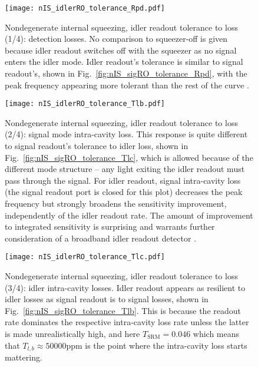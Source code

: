 \begin{figure}
    \centering
    \texttt{[image: nIS\_idlerRO\_tolerance\_Rpd.pdf]} 
    \caption{   Nondegenerate internal squeezing, idler readout tolerance to loss (1/4): detection losses. No comparison to squeezer-off is given because idler readout switches off with the squeezer as no signal enters the idler mode. Idler readout's tolerance is similar to signal readout's, shown in Fig.~\ref{fig:nIS_sigRO_tolerance_Rpd}, with the peak frequency appearing more tolerant than the rest of the curve . }
    \label{fig:}
\end{figure}
\begin{figure}
	\centering
	\texttt{[image: nIS\_idlerRO\_tolerance\_Tlb.pdf]}
	\caption{ Nondegenerate internal squeezing, idler readout tolerance to loss (2/4): signal mode intra-cavity loss. This response is quite different to signal readout's tolerance to idler loss, shown in Fig.~\ref{fig:nIS_sigRO_tolerance_Tlc}, which is allowed because of the different mode structure -- any light exiting the idler readout must pass through the signal. For idler readout, signal intra-cavity loss (the signal readout port is closed for this plot) decreases the peak frequency but strongly broadens the sensitivity improvement, independently of the idler readout rate. The amount of improvement to integrated sensitivity is surprising  and warrants further consideration of a broadband idler readout detector .}
	\label{fig:}
\end{figure}
\begin{figure}
	\centering
	\texttt{[image: nIS\_idlerRO\_tolerance\_Tlc.pdf]}
	\caption{  Nondegenerate internal squeezing, idler readout tolerance to loss (3/4): idler intra-cavity losses. Idler readout appears as resilient to idler losses as signal readout is to signal losses, shown in Fig.~\ref{fig:nIS_sigRO_tolerance_Tlb}. This is because the readout rate dominates the respective intra-cavity loss rate unless the latter is made unrealistically high, and here $T_\text{SRM}=0.046$ which means that $T_{l,b}\approx50000\text{ppm}$ is the point where the intra-cavity loss starts mattering.}
	\label{fig:}
\end{figure}

